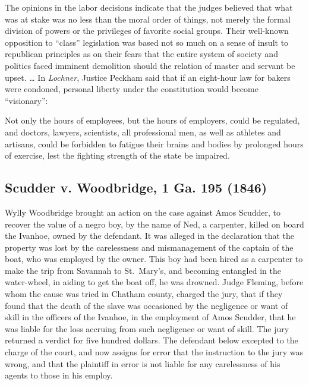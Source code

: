 \documentclass[
  letterpaper,
  11pt,
  DIV=9,
  openright]{scrbook}
\renewenvironment{quote}{
  \list{}{\leftmargin=2em\rightmargin=2em}
  \item\relax\small
}
{\endlist}
\begin{document}
The opinions in the labor decisions indicate that the judges believed
that what was at stake was no less than the moral order of things, not
merely the formal division of powers or the privileges of favorite
social groups. Their well-known opposition to ``class'' legislation was
based not so much on a sense of insult to republican principles as on
their fears that the entire system of society and politics faced
imminent demolition should the relation of master and servant be upset.
\ldots{} In \emph{Lochner}, Justice Peckham said that if an eight-hour
law for bakers were condoned, personal liberty under the constitution
would become ``visionary'':

\begin{quote}
Not only the hours of employees, but the hours of employers, could be
regulated, and doctors, lawyers, scientists, all professional men, as
well as athletes and artisans, could be forbidden to fatigue their
brains and bodies by prolonged hours of exercise, lest the fighting
strength of the state be impaired.

\subsection{Scudder v. Woodbridge, 1 Ga. 195
(1846)}\label{scudder-v.-woodbridge-1-ga.-195-1846}
\end{quote}

Wylly Woodbridge brought an action on the case against Amos Scudder, to
recover the value of a negro boy, by the name of Ned, a carpenter,
killed on board the Ivanhoe, owned by the defendant. It was alleged in
the declaration that the property was lost by the carelessness and
mismanagement of the captain of the boat, who was employed by the owner.
This boy had been hired as a carpenter to make the trip from Savannah to
St.~Mary's, and becoming entangled in the water-wheel, in aiding to get
the boat off, he was drowned. Judge Fleming, before whom the cause was
tried in Chatham county, charged the jury, that if they found that the
death of the slave was occasioned by the negligence or want of skill in
the officers of the Ivanhoe, in the employment of Amos Scudder, that he
was liable for the loss accruing from such negligence or want of skill.
The jury returned a verdict for five hundred dollars. The defendant
below excepted to the charge of the court, and now assigns for error
that the instruction to the jury was wrong, and that the plaintiff in
error is not liable for any carelessness of his agents to those in his
employ.
\end{document}
